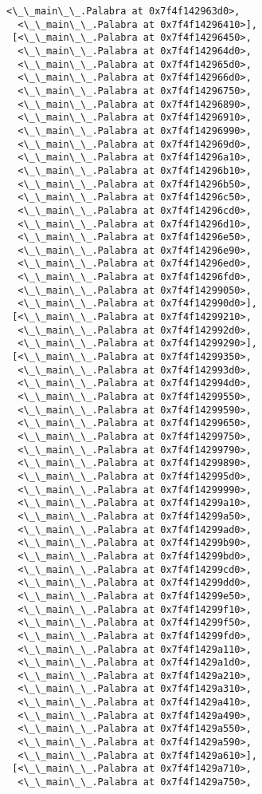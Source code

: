 \documentclass[12pt,a4paper,table]{article}
\begin{document}
\begin{tcolorbox}[breakable, size=fbox, boxrule=.5pt, pad at break*=1mm, opacityfill=0]
\begin{Verbatim}[commandchars=\\\{\}]
  <\_\_main\_\_.Palabra at 0x7f4f142963d0>,
  <\_\_main\_\_.Palabra at 0x7f4f14296410>],
 [<\_\_main\_\_.Palabra at 0x7f4f14296450>,
  <\_\_main\_\_.Palabra at 0x7f4f142964d0>,
  <\_\_main\_\_.Palabra at 0x7f4f142965d0>,
  <\_\_main\_\_.Palabra at 0x7f4f142966d0>,
  <\_\_main\_\_.Palabra at 0x7f4f14296750>,
  <\_\_main\_\_.Palabra at 0x7f4f14296890>,
  <\_\_main\_\_.Palabra at 0x7f4f14296910>,
  <\_\_main\_\_.Palabra at 0x7f4f14296990>,
  <\_\_main\_\_.Palabra at 0x7f4f142969d0>,
  <\_\_main\_\_.Palabra at 0x7f4f14296a10>,
  <\_\_main\_\_.Palabra at 0x7f4f14296b10>,
  <\_\_main\_\_.Palabra at 0x7f4f14296b50>,
  <\_\_main\_\_.Palabra at 0x7f4f14296c50>,
  <\_\_main\_\_.Palabra at 0x7f4f14296cd0>,
  <\_\_main\_\_.Palabra at 0x7f4f14296d10>,
  <\_\_main\_\_.Palabra at 0x7f4f14296e50>,
  <\_\_main\_\_.Palabra at 0x7f4f14296e90>,
  <\_\_main\_\_.Palabra at 0x7f4f14296ed0>,
  <\_\_main\_\_.Palabra at 0x7f4f14296fd0>,
  <\_\_main\_\_.Palabra at 0x7f4f14299050>,
  <\_\_main\_\_.Palabra at 0x7f4f142990d0>],
 [<\_\_main\_\_.Palabra at 0x7f4f14299210>,
  <\_\_main\_\_.Palabra at 0x7f4f142992d0>,
  <\_\_main\_\_.Palabra at 0x7f4f14299290>],
 [<\_\_main\_\_.Palabra at 0x7f4f14299350>,
  <\_\_main\_\_.Palabra at 0x7f4f142993d0>,
  <\_\_main\_\_.Palabra at 0x7f4f142994d0>,
  <\_\_main\_\_.Palabra at 0x7f4f14299550>,
  <\_\_main\_\_.Palabra at 0x7f4f14299590>,
  <\_\_main\_\_.Palabra at 0x7f4f14299650>,
  <\_\_main\_\_.Palabra at 0x7f4f14299750>,
  <\_\_main\_\_.Palabra at 0x7f4f14299790>,
  <\_\_main\_\_.Palabra at 0x7f4f14299890>,
  <\_\_main\_\_.Palabra at 0x7f4f142995d0>,
  <\_\_main\_\_.Palabra at 0x7f4f14299990>,
  <\_\_main\_\_.Palabra at 0x7f4f14299a10>,
  <\_\_main\_\_.Palabra at 0x7f4f14299a50>,
  <\_\_main\_\_.Palabra at 0x7f4f14299ad0>,
  <\_\_main\_\_.Palabra at 0x7f4f14299b90>,
  <\_\_main\_\_.Palabra at 0x7f4f14299bd0>,
  <\_\_main\_\_.Palabra at 0x7f4f14299cd0>,
  <\_\_main\_\_.Palabra at 0x7f4f14299dd0>,
  <\_\_main\_\_.Palabra at 0x7f4f14299e50>,
  <\_\_main\_\_.Palabra at 0x7f4f14299f10>,
  <\_\_main\_\_.Palabra at 0x7f4f14299f50>,
  <\_\_main\_\_.Palabra at 0x7f4f14299fd0>,
  <\_\_main\_\_.Palabra at 0x7f4f1429a110>,
  <\_\_main\_\_.Palabra at 0x7f4f1429a1d0>,
  <\_\_main\_\_.Palabra at 0x7f4f1429a210>,
  <\_\_main\_\_.Palabra at 0x7f4f1429a310>,
  <\_\_main\_\_.Palabra at 0x7f4f1429a410>,
  <\_\_main\_\_.Palabra at 0x7f4f1429a490>,
  <\_\_main\_\_.Palabra at 0x7f4f1429a550>,
  <\_\_main\_\_.Palabra at 0x7f4f1429a590>,
  <\_\_main\_\_.Palabra at 0x7f4f1429a610>],
 [<\_\_main\_\_.Palabra at 0x7f4f1429a710>,
  <\_\_main\_\_.Palabra at 0x7f4f1429a750>,

\end{Verbatim}
\end{tcolorbox}
\end{document}

